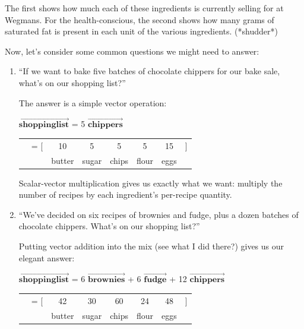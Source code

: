 The first shows how much each of these ingredients is currently selling for at
Wegmans. For the health-conscious, the second shows how many grams of
saturated fat is present in each unit of the various ingredients. (*shudder*)

\medskip
Now, let's consider some common questions we might need to answer:

\begin{enumerate}
\itemsep1.5em
\item ``If we want to bake five batches of chocolate chippers for our bake sale,
what's on our shopping list?''

The answer is a simple vector operation:


\vspace{.2in}
$\overrightarrow{\textbf{shoppinglist}}$ = 5 
$\overrightarrow{\textbf{chippers}}$
\vspace{-.15in}
\begin{center}
\begin{tabular}{rlcccccc}
&\quad\quad= [ & 10 & 5 & 5 & 5 & 15 &] \\
&& \scriptsize{butter} & \scriptsize{sugar} & \scriptsize{chips} &
\scriptsize{flour} & \scriptsize{eggs} & \smallskip \\
\end{tabular}
\end{center}

Scalar-vector multiplication gives us exactly what we want: multiply the number
of recipes by each ingredient's per-recipe quantity.

\item ``We've decided on six recipes of brownies and fudge, plus a dozen
batches of chocolate chippers. What's on our shopping list?''
\label{shoppingListQuestion}

Putting vector addition into the mix (see what I did there?) gives us our
elegant answer:

\begin{center}
$\overrightarrow{\textbf{shoppinglist}}$ 
= 6 $\overrightarrow{\textbf{brownies}}$
+ 6 $\overrightarrow{\textbf{fudge}}$
+ 12 $\overrightarrow{\textbf{chippers}}$

\begin{tabular}{rlcccccc}
&\quad\quad\quad\quad  = [ & 42 & 30 & 60 & 24 & 48 &] \\
&& \scriptsize{butter} & \scriptsize{sugar} & \scriptsize{chips} &
\scriptsize{flour} & \scriptsize{eggs} & \smallskip \\
\end{tabular}
\end{center}


\end{enumerate}
